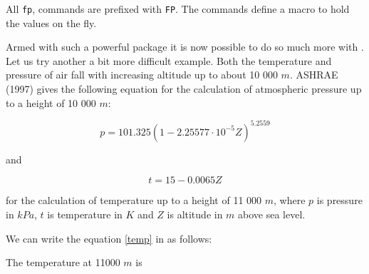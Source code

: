 All \texttt{fp}, commands are prefixed with \texttt{FP}. The commands define a macro to hold the values on the fly.

Armed with such a powerful package it is now possible to do so much more with \tex. Let us try another a bit more difficult example. Both the temperature and pressure of air fall with increasing altitude up to about 10 000 $m$. ASHRAE (1997) gives the following equation for the calculation of atmospheric pressure up to a height of 10 000 $m$:

\begin{equation}
p = 101.325 (1 - 2.25577 \cdot 10^{-5}Z)^{5.2559} 
\end{equation}

\noindent and

\begin{equation}
t = 15 - 0.0065Z \label{temp}
\end{equation}


\noindent for the calculation of temperature up to a height of 11 000 $m$, where $p$ is pressure in $kPa$, $t$ is temperature in $K$ and $Z$ is altitude in $m$ above sea level.

We can write the equation \ref{temp} in \tex as follows:

\begin{teX}
\makeatletter

\def\temperature@altitude#1{%
  \FPmul\termone{65}{#1}%
  \FPdiv\termtwo{\termone}{10000}%
  \FPsub\temperature{15}{\termtwo}%
  \texttt{\temperature}
}

\noindent The temperature at 11000 $m$ is 
\temperature@altitude{11000}\hfil\hfill

\makeatother
\end{teX}



\makeatletter

\def\temperature@altitude#1{%
\FPmul\termone{65}{#1}%
\FPdiv\termtwo{\termone}{10000}%
\FPsub\temperature{15}{\termtwo}%
\texttt{\temperature}
}

